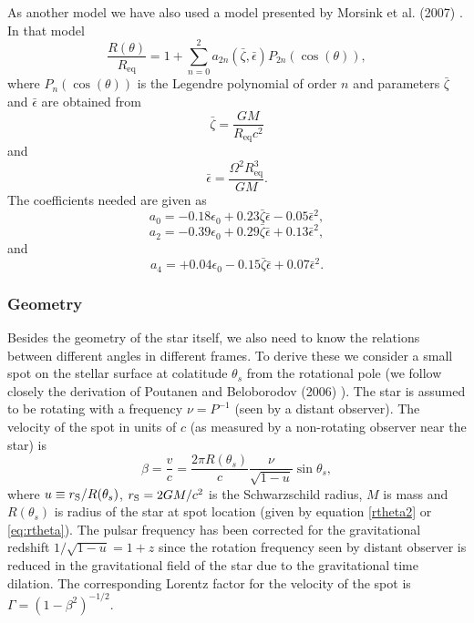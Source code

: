 \documentclass{wihuri}
\def\rg{r_{\rm S}} %
\def\be{\begin{equation}}
\def\ee{\end{equation}}
\def\rg{r_{\rm S}} %
\def\thetas{\theta_{s}}
\begin{document}
As another model %
we have also used a model presented by Morsink et al. (2007) \cite{morsink}. In that model
\be\label{eq:rtheta}
\frac{R(\theta)}{R_{\mathrm{eq}}} = 1 + \sum\limits_{n=0}^2 a_{2n}(\bar{\zeta},\bar{\epsilon})P_{2n}(\cos(\theta)), 
\ee
where $P_{n}(\cos(\theta))$ is the Legendre polynomial of order $n$ and parameters $\bar{\zeta}$ and $\bar{\epsilon}$ are obtained from
\be\label{eq:parzeta}
\bar{\zeta} = \frac{GM}{R_{\mathrm{eq}}c^{2}}
\ee
and
\be\label{eq:parepsilon}
\bar{\epsilon} = \frac{\Omega^{2}R_{\mathrm{eq}}^{3}}{GM}.
\ee
The coefficients needed are given as
\be\label{eq:azero}
a_{0} = -0.18\epsilon_{0}+0.23\bar{\zeta}\bar{\epsilon}-0.05\bar{\epsilon}^{2}, 
\ee
\be\label{eq:atwo}
a_{2} = -0.39\epsilon_{0}+0.29\bar{\zeta}\bar{\epsilon}+0.13\bar{\epsilon}^{2},
\ee
and
\be\label{eq:afour}
a_{4} = +0.04\epsilon_{0}-0.15\bar{\zeta}\bar{\epsilon}+0.07\bar{\epsilon}^{2}.
\ee


\subsubsection{Geometry}

Besides the geometry of the star itself, we also need to know the relations between different angles in different frames. To derive these we consider a small spot on the stellar surface at colatitude $\thetas$ from the rotational pole (we follow closely the derivation of Poutanen and Beloborodov (2006) \cite{poutabelo}). 
The star is assumed to be rotating  with a frequency $\nu=P^{-1}$ (seen by a distant observer).
The velocity of the spot in units of $c$ (as measured by a non-rotating observer near the star)  %
is 
\begin{equation}
\label{beta2}
\beta = \frac{v}{c}=\frac{2\pi R(\thetas)}{c} \frac{\nu}{\sqrt{1-u}} \sin\thetas, 
\end{equation}
where %
$u\equiv\rg/R(\thetas)$, 
$\rg=2GM/c^2$ is the Schwarzschild radius, $M$ is mass and $R(\thetas)$ is
radius of the star at spot location (given by equation \ref{rtheta2} or \ref{eq:rtheta}). The pulsar frequency has been corrected for the gravitational redshift $1/\sqrt{1-u}=1+z$ since the rotation frequency seen by distant observer is reduced in the gravitational field of the star due to the gravitational time dilation. The corresponding Lorentz factor for the velocity of the spot is $\Gamma=(1-\beta^2)^{-1/2}$.
\end{document}
